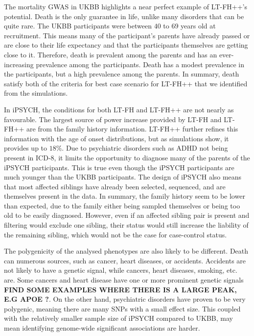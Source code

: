 The mortality GWAS in UKBB highlights a near perfect example of LT-FH++'s potential. Death is the only guarantee in life, unlike many disorders that can be quite rare. The UKBB participants were between $ 40 $ to $ 69 $ years old at recruitment. This means many of the participant's parents have already passed or are close to their life expectancy and that the participants themselves are getting close to it. Therefore, death is prevalent among the parents and has an ever-increasing prevalence among the participants. Death has a modest prevalence in the participants, but a high prevalence among the parents. In summary, death satisfy both of the criteria for best case scenario for LT-FH++ that we identified from the simulations. 

In iPSYCH, the conditions for both LT-FH and LT-FH++ are not nearly as favourable. The largest source of power increase provided by LT-FH and LT-FH++ are from the family history information. LT-FH++ further refines this information with the age of onset distributions, but as simulations show, it provides up to $ 18\% $. Due to psychiatric disorders such as ADHD not being present in ICD-8, it limits the opportunity to diagnose many of the parents of the iPSYCH participants. This is true even though the iPSYCH participants are much younger than the UKBB participants. The design of iPSYCH also means that most affected siblings have already been selected, sequenced, and are themselves present in the data. In summary, the family history seem to be lower than expected, due to the family either being sampled themselves or being too old to be easily diagnosed. However, even if an affected sibling pair is present and filtering would exclude one sibling, their status would still increase the liability of the remaining sibling, which would not be the case for case-control status.

The polygenicity of the analysed phenotypes are also likely to be different. Death can numerous sources, such as cancer, heart diseases, or accidents. Accidents are not likely to have a genetic signal, while cancers, heart diseases, smoking, etc. are. Some cancers and heart disease have one or more prominent genetic signals \textbf{FIND SOME EXAMPLES WHERE THERE IS A LARGE PEAK, E.G APOE ?}. On the other hand, psychiatric disorders have proven to be very polygenic, meaning there are many SNPs with a small effect size. This coupled with the relatively smaller sample size of iPSYCH compared to UKBB, may mean identifying genome-wide significant associations are harder.

